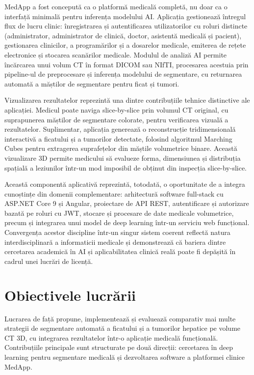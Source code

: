 \documentclass[12pt, a4paper]{report}
\begin{document}
MedApp a fost concepută ca o platformă medicală completă, nu
doar ca o interfață minimală pentru inferența modelului AI.
Aplicația gestionează întregul flux de lucru clinic: înregistrarea
și autentificarea utilizatorilor cu roluri distincte (administrator,
administrator de clinică, doctor, asistentă medicală și pacient),
gestionarea clinicilor, a programărilor și a dosarelor medicale,
emiterea de rețete electronice și stocarea scanărilor medicale.
Modulul de analiză AI permite încărcarea unui volum CT în format
DICOM sau NIfTI, procesarea acestuia prin pipeline-ul de
preprocesare și inferența modelului de segmentare, cu returnarea
automată a măștilor de segmentare pentru ficat și tumori.

Vizualizarea rezultatelor reprezintă una dintre contribuțiile
tehnice distinctive ale aplicației. Medicul poate naviga
slice-by-slice prin volumul CT original, cu suprapunerea măștilor
de segmentare colorate, pentru verificarea vizuală a rezultatelor.
Suplimentar, aplicația generează o reconstrucție tridimensională
interactivă a ficatului și a tumorilor detectate, folosind
algoritmul Marching Cubes pentru extragerea suprafețelor din
măștile volumetrice binare. Această vizualizare 3D permite
medicului să evalueze forma, dimensiunea și distribuția spațială
a leziunilor într-un mod imposibil de obținut din inspecția
slice-by-slice.

Această componentă aplicativă reprezintă, totodată, o oportunitate
de a integra cunoștințe din domenii complementare: arhitectură
software full-stack cu ASP.NET Core 9 și Angular, proiectare de
API REST, autentificare și autorizare bazată pe roluri cu JWT,
stocare și procesare de date medicale volumetrice, precum și
integrarea unui model de deep learning într-un serviciu web
funcțional. Convergența acestor discipline într-un singur sistem
coerent reflectă natura interdisciplinară a informaticii medicale
și demonstrează că bariera dintre cercetarea academică în AI și
aplicabilitatea clinică reală poate fi depășită în cadrul unei
lucrări de licență.


\section{Obiectivele lucrării}

Lucrarea de față propune, implementează și evaluează comparativ
mai multe strategii de segmentare automată a ficatului și a
tumorilor hepatice pe volume CT 3D, cu integrarea rezultatelor
într-o aplicație medicală funcțională. Contribuțiile principale
sunt structurate pe două direcții: cercetarea în deep learning
pentru segmentare medicală și dezvoltarea software a platformei
clinice MedApp.
\end{document}
